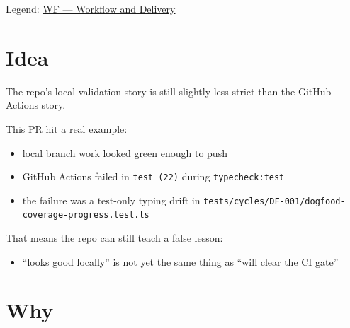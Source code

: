 Legend: \href{https://github.com/flyingrobots/bijou/blob/1853ad902f6bf219326409e7f743a5a1d6517dbc/docs/method/legends/WF-workflow-and-delivery.md}{WF --- Workflow and Delivery}

\section{Idea}\label{record-409-idea}

The repo's local validation story is still slightly less strict than the GitHub Actions story.

This PR hit a real example:

\begin{itemize}
\tightlist
\item
  local branch work looked green enough to push
\item
  GitHub Actions failed in \texttt{t\allowbreak{}e\allowbreak{}s\allowbreak{}t\allowbreak{} \allowbreak{}(\allowbreak{}2\allowbreak{}2\allowbreak{})} during \texttt{t\allowbreak{}y\allowbreak{}p\allowbreak{}e\allowbreak{}c\allowbreak{}h\allowbreak{}e\allowbreak{}c\allowbreak{}k\allowbreak{}:\allowbreak{}t\allowbreak{}e\allowbreak{}s\allowbreak{}t}
\item
  the failure was a test-only typing drift in \texttt{t\allowbreak{}e\allowbreak{}s\allowbreak{}t\allowbreak{}s\allowbreak{}/\allowbreak{}c\allowbreak{}y\allowbreak{}c\allowbreak{}l\allowbreak{}e\allowbreak{}s\allowbreak{}/\allowbreak{}D\allowbreak{}F\allowbreak{}-\allowbreak{}0\allowbreak{}0\allowbreak{}1\allowbreak{}/\allowbreak{}d\allowbreak{}o\allowbreak{}g\allowbreak{}f\allowbreak{}o\allowbreak{}o\allowbreak{}d\allowbreak{}-\allowbreak{}c\allowbreak{}o\allowbreak{}v\allowbreak{}e\allowbreak{}r\allowbreak{}a\allowbreak{}g\allowbreak{}e\allowbreak{}-\allowbreak{}p\allowbreak{}r\allowbreak{}o\allowbreak{}g\allowbreak{}r\allowbreak{}e\allowbreak{}s\allowbreak{}s\allowbreak{}.\allowbreak{}t\allowbreak{}e\allowbreak{}s\allowbreak{}t\allowbreak{}.\allowbreak{}t\allowbreak{}s}
\end{itemize}

That means the repo can still teach a false lesson:

\begin{itemize}
\tightlist
\item
  ``looks good locally'' is not yet the same thing as ``will clear the CI gate''
\end{itemize}

\section{Why}\label{record-409-why}

